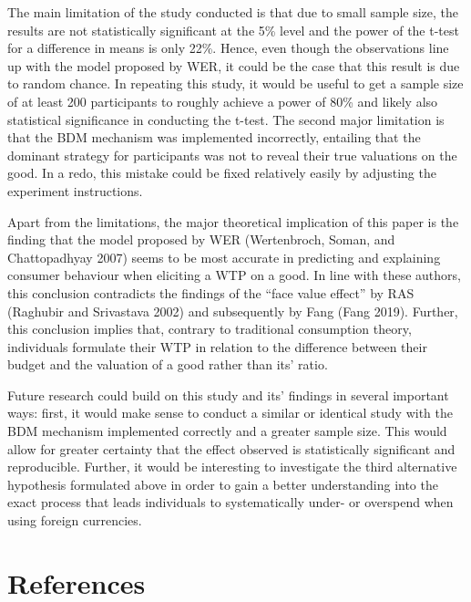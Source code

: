 \documentclass[
]{report}
\begin{document}
The main limitation of the study conducted is that due to small sample
size, the results are not statistically significant at the 5\% level and
the power of the t-test for a difference in means is only 22\%. Hence,
even though the observations line up with the model proposed by WER, it
could be the case that this result is due to random chance. In repeating
this study, it would be useful to get a sample size of at least 200
participants to roughly achieve a power of 80\% and likely also
statistical significance in conducting the t-test. The second major
limitation is that the BDM mechanism was implemented incorrectly,
entailing that the dominant strategy for participants was not to reveal
their true valuations on the good. In a redo, this mistake could be
fixed relatively easily by adjusting the experiment instructions.

Apart from the limitations, the major theoretical implication of this
paper is the finding that the model proposed by WER (Wertenbroch, Soman,
and Chattopadhyay 2007) seems to be most accurate in predicting and
explaining consumer behaviour when eliciting a WTP on a good. In line
with these authors, this conclusion contradicts the findings of the
``face value effect'' by RAS (Raghubir and Srivastava 2002) and
subsequently by Fang (Fang 2019). Further, this conclusion implies that,
contrary to traditional consumption theory, individuals formulate their
WTP in relation to the difference between their budget and the valuation
of a good rather than its' ratio.

Future research could build on this study and its' findings in several
important ways: first, it would make sense to conduct a similar or
identical study with the BDM mechanism implemented correctly and a
greater sample size. This would allow for greater certainty that the
effect observed is statistically significant and reproducible. Further,
it would be interesting to investigate the third alternative hypothesis
formulated above in order to gain a better understanding into the exact
process that leads individuals to systematically under- or overspend
when using foreign currencies.

\chapter{References}\label{references}
\end{document}
